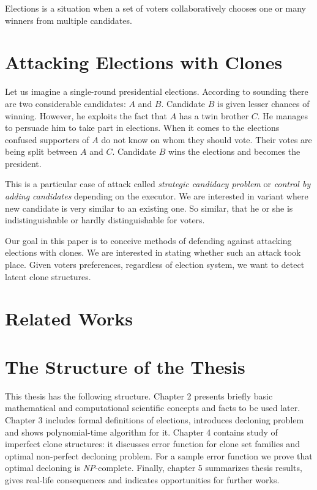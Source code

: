 Elections is a situation when a set of voters collaboratively chooses one or many winners from multiple candidates.

\section{Attacking Elections with Clones}

Let us imagine a single-round presidential elections.
According to sounding there are two considerable candidates: $A$ and $B$.
Candidate $B$ is given lesser chances of winning.
However, he exploits the fact that $A$ has a twin brother $C$.
He manages to persuade him to take part in elections.
When it comes to the elections confused supporters of $A$ do not know on whom they should vote.
Their votes are being split between $A$ and $C$.
Candidate $B$ wins the elections and becomes the president.

This is a particular case of attack called \textit{strategic candidacy problem} or \textit{control by adding candidates}
depending on the executor.
We are interested in variant where new candidate is very similar to an existing one.
So similar, that he or she is indistinguishable or hardly distinguishable for voters.

Our goal in this paper is to conceive methods of defending against attacking elections with clones.
We are interested in stating whether such an attack took place.
Given voters preferences, regardless of election system, we want to detect latent clone structures.

\section{Related Works}


\section{The Structure of the Thesis}


This thesis has the following structure.
Chapter 2 presents briefly basic mathematical and computational scientific concepts and facts to be used later.
Chapter 3 includes formal definitions of elections, introduces decloning problem and shows polynomial-time algorithm for it.
Chapter 4 contains study of imperfect clone structures:
it discusses error function for clone set families and optimal non-perfect decloning problem.
For a sample error function we prove that optimal decloning is \textit{NP}-complete.
Finally, chapter 5 summarizes thesis results, gives real-life consequences and indicates opportunities for further works.